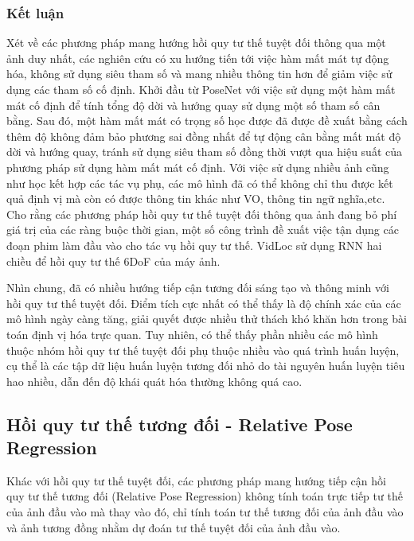 \subsubsection*{Kết luận}
Xét về các phương pháp mang hướng hồi quy tư thế tuyệt đối thông qua một ảnh duy nhất, các nghiên cứu có xu hướng tiến tới việc hàm mất mát tự động hóa, không sử dụng siêu tham số và mang nhiều thông tin hơn để giảm việc sử dụng các tham số cố định. Khởi đầu từ PoseNet với việc sử dụng một hàm mất mát cố định để tính tổng độ dời và hướng quay sử dụng một số tham số cân bằng. Sau đó, một hàm mất mát có trọng số học được \cite{wang2019atloc, bui2019adversarial} đã được đề xuất bằng cách thêm độ không đảm bảo phương sai đồng nhất để tự động cân bằng mất mát độ dời và hướng quay, tránh sử dụng siêu tham số đồng thời vượt qua hiệu suất của phương pháp sử dụng hàm mất mát cố định. Với việc sử dụng nhiều ảnh cũng như học kết hợp các tác vụ phụ, các mô hình đã có thể không chỉ thu được kết quả định vị mà còn có được thông tin khác như VO, thông tin ngữ nghĩa,etc. Cho rằng các phương pháp hồi quy tư thế tuyệt đối thông qua ảnh đang bỏ phí giá trị của các ràng buộc thời gian, một số công trình \cite{clark2017vidloc, brahmbhatt2018geometryaware} đề xuất việc tận dụng các đoạn phim làm đầu vào cho tác vụ hồi quy tư thế. VidLoc \cite{clark2017vidloc} sử dụng RNN hai chiều để hồi quy tư thế 6DoF của máy ảnh.

Nhìn chung, đã có nhiều hướng tiếp cận tương đối sáng tạo và thông minh với hồi quy tư thế tuyệt đối. Điểm tích cực nhất có thể thấy là độ chính xác của các mô hình ngày càng tăng, giải quyết được nhiều thử thách khó khăn hơn trong bài toán định vị hóa trực quan. Tuy nhiên, có thể thấy phần nhiều các mô hình thuộc nhóm hồi quy tư thế tuyệt đối phụ thuộc nhiều vào quá trình huấn luyện, cụ thể là các tập dữ liệu huấn luyện tương đối nhỏ do tài nguyên huấn luyện tiêu hao nhiều, dẫn đến độ khái quát hóa thường không quá cao.

\subsection{Hồi quy tư thế tương đối - Relative Pose Regression}

Khác với hồi quy tư thế tuyệt đối, các phương pháp mang hướng tiếp cận hồi quy tư thế tương đối (Relative Pose Regression) không tính toán trực tiếp tư thế của ảnh đầu vào mà thay vào đó, chỉ tính toán tư thế tương đối của ảnh đầu vào và ảnh tương đồng nhằm dự đoán tư thế tuyệt đối của ảnh đầu vào.


